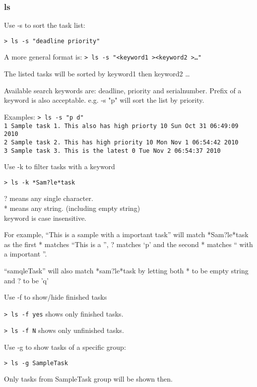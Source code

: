 \documentclass[12pt, a4paper]{article}
\begin{document}
\subsubsection{ls}

Use -s to sort the task list:

\texttt{\textgreater \ ls -s "deadline priority"}

A more general format is:
\texttt{\textgreater \ ls -s "\textless keyword1 \textgreater \textless keyword2 \textgreater \ldots"}

The listed tasks will be sorted by keyword1 then keyword2 \ldots
    
Available search keywords are: deadline, priority and serialnumber. Prefix of a keyword is also acceptable. e.g. \textgreaterls -s "p" will sort the list by priority.

Examples:
\texttt{\textgreater \ ls -s "p d"\\
  1   Sample task 1. This also has high priorty   10  Sun Oct 31 06:49:09 2010\\
  2   Sample task 2. This has high priority       10  Mon Nov  1 06:54:42 2010\\
  3   Sample task 3. This is the latest           0   Tue Nov  2 06:54:37 2010}

Use -k to filter tasks with a keyword

\texttt{\textgreater \ ls -k *Sam?le*task}

? means any single character.\\
* means any string. (including empty string)\\
keyword is case insensitive.

For example, ``This is a sample with a important task'' will match *Sam?le*task as the first * matches ``This is a '', ? matches `p' and the second * matches `` with a important ''.

``samqleTask'' will also match *sam?le*task by letting both * to be empty string and ? to be 'q' 

Use -f to show/hide finished tasks

\texttt{\textgreater \ ls -f yes} shows only finished tasks.

\texttt{\textgreater \ ls -f N} shows only unfinished tasks.

Use -g to show tasks of a specific group:

\texttt{\textgreater \ ls -g SampleTask}

Only tasks from SampleTask group will be shown then.
\end{document}
